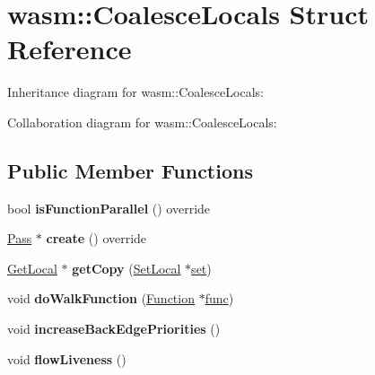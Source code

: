 \hypertarget{structwasm_1_1_coalesce_locals}{}\section{wasm\+:\+:Coalesce\+Locals Struct Reference}
\label{structwasm_1_1_coalesce_locals}


Inheritance diagram for wasm\+:\+:Coalesce\+Locals\+:


Collaboration diagram for wasm\+:\+:Coalesce\+Locals\+:
\subsection*{Public Member Functions}
\begin{DoxyCompactItemize}
\item 
\mbox{\label{structwasm_1_1_coalesce_locals_a4ce92a9e3b3488a1b51486d251ea045d}} 
bool {\bfseries is\+Function\+Parallel} () override
\item 
\mbox{\label{structwasm_1_1_coalesce_locals_ac12a5d015fb71cdac6fab2c9086a63af}} 
\mbox{\hyperlink{classwasm_1_1_pass}{Pass}} $\ast$ {\bfseries create} () override
\item 
\mbox{\label{structwasm_1_1_coalesce_locals_a38a68845d70745e820c6f1f01791d1de}} 
\mbox{\hyperlink{classwasm_1_1_get_local}{Get\+Local}} $\ast$ {\bfseries get\+Copy} (\mbox{\hyperlink{classwasm_1_1_set_local}{Set\+Local}} $\ast$\mbox{\hyperlink{classstd_1_1set}{set}})
\item 
\mbox{\label{structwasm_1_1_coalesce_locals_af40887c175d2e974370d6405f0c90e94}} 
void {\bfseries do\+Walk\+Function} (\mbox{\hyperlink{classwasm_1_1_function}{Function}} $\ast$\mbox{\hyperlink{structfunc}{func}})
\item 
\mbox{\label{structwasm_1_1_coalesce_locals_abbe2e3fa94db433944560b1648aa896c}} 
void {\bfseries increase\+Back\+Edge\+Priorities} ()
\item 
\mbox{\label{structwasm_1_1_coalesce_locals_aac33cbe61e670ff7935f1883cc6730f9}} 
void {\bfseries flow\+Liveness} ()

\end{DoxyCompactItemize}
